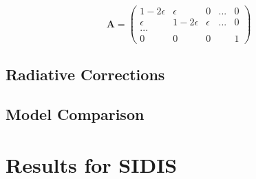 \begin{equation}
	\mathbf{A} = 
		\begin{pmatrix}
			1 - 2\epsilon &      \epsilon &        0 & ... & 0 \\
			\epsilon      & 1 - 2\epsilon & \epsilon & ... & 0 \\
			... \\
			0             &             0 &        0 &     & 1 
		\end{pmatrix}
\end{equation}

    
\subsection{Radiative Corrections}
\subsection{Model Comparison}

\section{Results for SIDIS}

